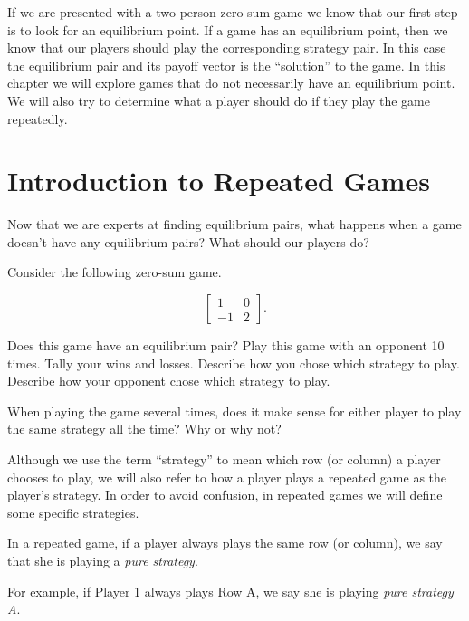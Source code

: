 If we are presented with a two-person zero-sum game we know that our first step is to look for an equilibrium point. If a game has an equilibrium point, then we know that our players should play the corresponding strategy pair. In this case the equilibrium pair and its payoff vector is the ``solution'' to the game. In this chapter we will explore games that do not necessarily have an equilibrium point. We will also try to determine what a player should do if they play the game repeatedly.

\section{Introduction to Repeated Games}

Now that we are experts at finding equilibrium pairs, what happens when a game doesn't have any equilibrium pairs? What should our players do?

\begin{example}\label{E:smallrepeat} Consider the following zero-sum game.

\[\left[\begin{matrix}
1&0\\
-1&2

\end{matrix}\right].\]

Does this game have an equilibrium pair? Play this game with an opponent 10 times. Tally your wins and losses. Describe how you chose which strategy to play. Describe how your opponent chose which strategy to play.
\end{example}

When playing the game several times, does it make sense for either player to play the same strategy all the time? Why or why not?

Although we use the term ``strategy'' to mean which row (or column) a player chooses to play, we will also refer to how a player plays a repeated game as the player's strategy. In order to avoid confusion, in repeated games we will define some specific strategies.

\begin{definition} In a repeated game, if a player always plays the same row (or column), we say that she is playing a \emph{pure strategy}.
\end{definition}

For example, if Player 1 always plays Row A, we say she is playing \emph{pure strategy A}. 

